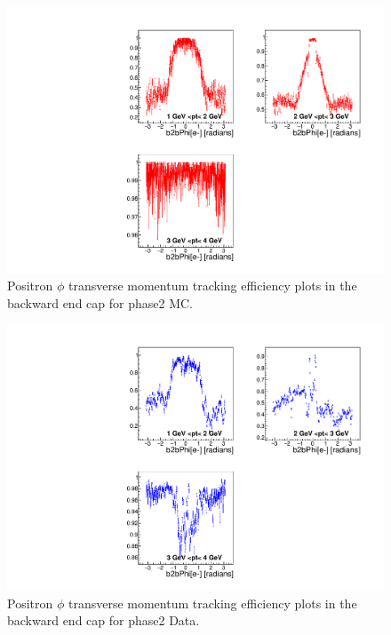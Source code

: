 \documentclass[a4paper,11pt,twosided,final,german,openbib,pdftex,listof=totoc,bibliography=totoc]{scrbook}
\begin{document}
\begin{appendix}


\clearpage







\begin{figure}[!htbp]
	\centering
	\includegraphics[width=\textwidth]{Plots/master/xPtMPhiepEC_MC}
	\caption[Transverse Momentum $\phi$ Positron Backward End Cap Efficiency Phase2 MC]{Positron $\phi$ transverse momentum tracking efficiency plots in the backward end cap for phase2 MC.}
	\label{plt:PtMPhiepEC_MC}
\end{figure}


\begin{figure}[!htbp]
	\centering
	\includegraphics[width=\textwidth]{Plots/master/xPtMPhiepEC_Data}
	\caption[Transverse Momentum $\phi$ Positron Backward End Cap Efficiency Phase2 Data]{Positron $\phi$ transverse momentum tracking efficiency plots in the backward end cap for phase2 Data.}
	\label{plt:PtMPhiepEC_Data}
\end{figure}









\end{appendix}
\end{document}
